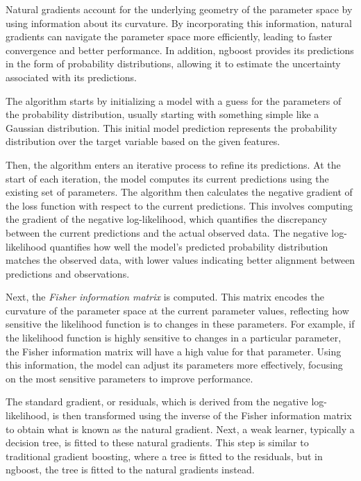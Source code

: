 Natural gradients account for the underlying geometry of the parameter space by using information about its curvature.
By incorporating this information, natural gradients can navigate the parameter space more efficiently, leading to faster convergence and better performance.
In addition, \gls{ngboost} provides its predictions in the form of probability distributions, allowing it to estimate the uncertainty associated with its predictions.

The algorithm starts by initializing a model with a guess for the parameters of the probability distribution, usually starting with something simple like a Gaussian distribution.
This initial model prediction represents the probability distribution over the target variable based on the given features.

Then, the algorithm enters an iterative process to refine its predictions.
At the start of each iteration, the model computes its current predictions using the existing set of parameters.
The algorithm then calculates the negative gradient of the loss function with respect to the current predictions.
This involves computing the gradient of the negative log-likelihood, which quantifies the discrepancy between the current predictions and the actual observed data.
The negative log-likelihood quantifies how well the model's predicted probability distribution matches the observed data, with lower values indicating better alignment between predictions and observations.

Next, the \textit{Fisher information matrix} is computed.
This matrix encodes the curvature of the parameter space at the current parameter values, reflecting how sensitive the likelihood function is to changes in these parameters.
For example, if the likelihood function is highly sensitive to changes in a particular parameter, the Fisher information matrix will have a high value for that parameter.
Using this information, the model can adjust its parameters more effectively, focusing on the most sensitive parameters to improve performance.

The standard gradient, or residuals, which is derived from the negative log-likelihood, is then transformed using the inverse of the Fisher information matrix to obtain what is known as the natural gradient.
Next, a weak learner, typically a decision tree, is fitted to these natural gradients.
This step is similar to traditional gradient boosting, where a tree is fitted to the residuals, but in \gls{ngboost}, the tree is fitted to the natural gradients instead.

